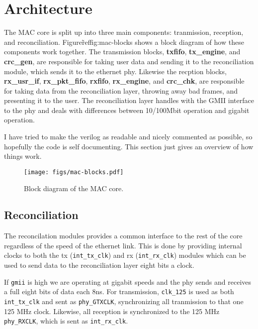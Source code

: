 \documentclass[11pt]{article}
\begin{document}
\section{Architecture}

The MAC core is split up into three main components: tranmission,
reception, and reconciliation.  Figure\~ref{fig:mac-blocks} shows a
block diagram of how these components work together.  The transmission
blocks, \textbf{txfifo}, \textbf{tx\_engine}, and \textbf{crc\_gen},
are responsible for taking user data and sending it to the
reconciliation module, which sends it to the ethernet phy.  Likewise
the recption blocks, \textbf{rx\_usr\_if}, \textbf{rx\_pkt\_fifo},
\textbf{rxfifo}, \textbf{rx\_engine}, and \textbf{crc\_chk}, are
responsible for taking data from the reconciliation layer, throwing
away bad frames, and presenting it to the user.  The reconciliation
layer handles with the GMII interface to the phy and deals with
differences between 10/100Mbit operation and gigabit operation.

I have tried to make the verilog as readable and nicely commented as
possible, so hopefully the code is self documenting.  This section
just gives an overview of how things work.

\begin{figure}
\centering \texttt{[image: figs/mac-blocks.pdf]}
\caption{Block diagram of the MAC core.}
\label{fig:mac-blocks}
\end{figure}

\subsection{Reconciliation}

The reconcilation modules provides a common interface to the rest of
the core regardless of the speed of the ethernet link.  This is done
by providing internal clocks to both the tx (\texttt{int\_tx\_clk})
and rx (\texttt{int\_rx\_clk}) modules which can be used to send data
to the reconciliation layer eight bits a clock.  

If \texttt{gmii} is high we are operating at gigabit speeds and the
phy sends and receives a full eight bits of data each 8ns.  For
transmission, \texttt{clk\_125} is used as both \texttt{int\_tx\_clk}
and sent as \texttt{phy\_GTXCLK}, synchronizing all tranmission to
that one 125 MHz clock.  Likewise, all reception is synchronized to
the 125 MHz \texttt{phy\_RXCLK}, which is sent as
\texttt{int\_rx\_clk}.
\end{document}
